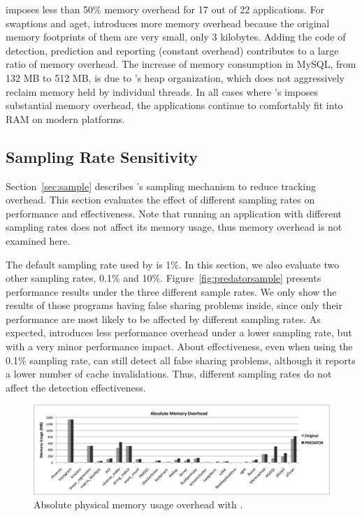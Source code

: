 \Predator{} imposes less than 50\% memory overhead for 17 out of 22 applications.  For swaptions and aget, \Predator{} introduces more memory overhead because the original memory footprints of them are very small, only $3$ kilobytes. Adding the code of detection, prediction and reporting (constant overhead) contributes to a large ratio of memory overhead. The increase of memory consumption in MySQL, from 132 MB to 512 MB, is due to \Predator{}'s heap organization, which does not aggressively reclaim memory held by individual threads. In all cases where \Predator{}'s imposes substantial memory overhead, the applications continue to comfortably fit into RAM on modern platforms.


\subsection{Sampling Rate Sensitivity}
\label{sec:predatorsensitivity}
Section~\ref{sec:sample} describes \Predator{}'s sampling mechanism to reduce tracking overhead. This section evaluates the effect of different sampling rates on performance and effectiveness. Note that running an application with different sampling rates does not affect its memory usage, thus memory overhead is not examined here. 

The default sampling rate used by \Predator{} is 1\%. In this section, we also evaluate two other sampling rates, 0.1\% and 10\%. Figure~\ref{fig:predatorsample} presents performance results under the three different sample rates. We only show the results of those programs having false sharing problems inside, since only their performance are most likely to be affected by different sampling rates. As expected, \Predator{} introduces less performance overhead under a lower sampling rate, but with a very minor performance impact. About effectiveness, even when using the 0.1\% sampling rate, \Predator{} can still detect all false sharing problems, although it reports a lower number of cache invalidations. Thus, different sampling rates do not affect the detection effectiveness.
 
\begin{figure}[!t]
\centering
\includegraphics[width=6in]{predator/figure/absolutememory}
\caption{Absolute physical memory usage overhead with \Predator{}.}
\label{fig:absolutememusage}
\end{figure}

